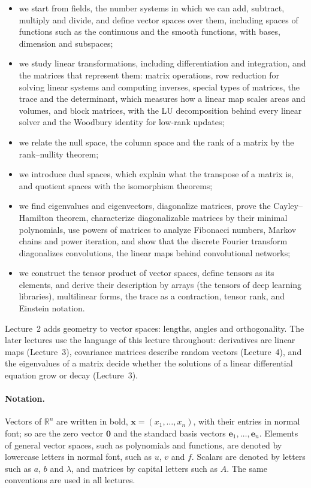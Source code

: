 \documentclass[11pt]{article}
\theoremstyle{definition}
\theoremstyle{plain}
\theoremstyle{remark}
\begin{document}
\begin{itemize}
    \item we start from fields, the number systems in which we can add, subtract, multiply and divide, and define vector spaces over them, including spaces of functions such as the continuous and the smooth functions, with bases, dimension and subspaces;
    \item we study linear transformations, including differentiation and integration, and the matrices that represent them: matrix operations, row reduction for solving linear systems and computing inverses, special types of matrices, the trace and the determinant, which measures how a linear map scales areas and volumes, and block matrices, with the LU decomposition behind every linear solver and the Woodbury identity for low-rank updates;
    \item we relate the null space, the column space and the rank of a matrix by the rank--nullity theorem;
    \item we introduce dual spaces, which explain what the transpose of a matrix is, and quotient spaces with the isomorphism theorems;
    \item we find eigenvalues and eigenvectors, diagonalize matrices, prove the Cayley--Hamilton theorem, characterize diagonalizable matrices by their minimal polynomials, use powers of matrices to analyze Fibonacci numbers, Markov chains and power iteration, and show that the discrete Fourier transform diagonalizes convolutions, the linear maps behind convolutional networks;
    \item we construct the tensor product of vector spaces, define tensors as its elements, and derive their description by arrays (the tensors of deep learning libraries), multilinear forms, the trace as a contraction, tensor rank, and Einstein notation.
\end{itemize}
Lecture~2 adds geometry to vector spaces: lengths, angles and orthogonality. The later lectures use the language of this lecture throughout: derivatives are linear maps (Lecture~3), covariance matrices describe random vectors (Lecture~4), and the eigenvalues of a matrix decide whether the solutions of a linear differential equation grow or decay (Lecture~3).

\paragraph{Notation.} Vectors of $\mathbb{R}^n$ are written in bold, $\mathbf{x} = (x_1, \ldots, x_n)$, with their entries in normal font; so are the zero vector $\mathbf{0}$ and the standard basis vectors $\mathbf{e}_1, \ldots, \mathbf{e}_n$. Elements of general vector spaces, such as polynomials and functions, are denoted by lowercase letters in normal font, such as $u$, $v$ and $f$. Scalars are denoted by letters such as $a$, $b$ and $\lambda$, and matrices by capital letters such as $A$. The same conventions are used in all lectures.
\end{document}
